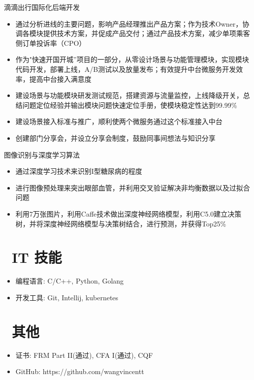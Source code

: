 \documentclass{resume}
\begin{document}
滴滴出行国际化后端开发
\begin{itemize}
  \item 通过分析进线的主要问题，影响产品经理推出产品方案；作为技术Owner，协调各模块提供技术方案，并促成产品交付；通过产品技术方案，减少单项乘客侧订单投诉率（CPO）
  \item 作为"快速开国开城”项目的一部分，从零设计场景与功能管理模块，实现模块代码开发，部署上线，A/B测试以及放量发布；有效提升中台微服务开发效率，提高中台接入满意度
  \item 建设场景与功能模块研发测试规范，搭建资源与流量监控，上线降级开关，总结问题定位经验并输出模块问题快速定位手册，使模块稳定性达到99.99\%
  \item 建设场景接入标准与推广，顺利使两个微服务通过这个标准接入中台
  \item 创建部门分享会，并设立分享会制度，鼓励同事间想法与知识分享
\end{itemize}

\begin{onehalfspacing}
图像识别与深度学习算法
\begin{itemize}
  \item 通过深度学习技术来识别I型糖尿病的程度
  \item 进行图像预处理来突出眼部血管，并利用交叉验证解决非均衡数据以及过拟合问题
  \item 利用7万张图片，利用Caffe技术做出深度神经网络模型，利用C5.0建立决策树，并将深度神经网络模型与决策树结合，进行预测，并获得Top25\%
\end{itemize}
\end{onehalfspacing}


\section{\faCogs\ IT 技能}
\begin{itemize}[parsep=0.5ex]
  \item 编程语言: C/C++, Python, Golang
  \item 开发工具: Git, Intellij, kubernetes
\end{itemize}

\section{\faInfo\ 其他}
\begin{itemize}[parsep=0.5ex]
  \item 证书: FRM Part II(通过), CFA I(通过), CQF
  \item GitHub: https://github.com/wangvincentt
\end{itemize}

%
%
\end{document}
